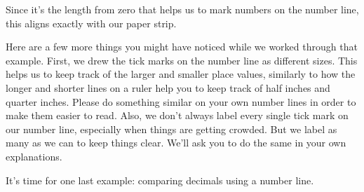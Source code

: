 \documentclass{ximera}
\begin{document}
\begin{example}
\begin{image}
\end{image}
Since it's the length from zero that helps us to mark numbers on the number line, this aligns exactly with our paper strip.

\end{example}

Here are a few more things you might have noticed while we worked through that example. First, we drew the tick marks on the number line as different sizes. This helps us to keep track of the larger and smaller place values, similarly to how the longer and shorter lines on a ruler help you to keep track of half inches and quarter inches. Please do something similar on your own number lines in order to make them easier to read. Also, we don't always label every single tick mark on our number line, especially when things are getting crowded. But we label as many as we can to keep things clear. We'll ask you to do the same in your own explanations.

It's time for one last example: comparing decimals using a number line.
\end{document}
